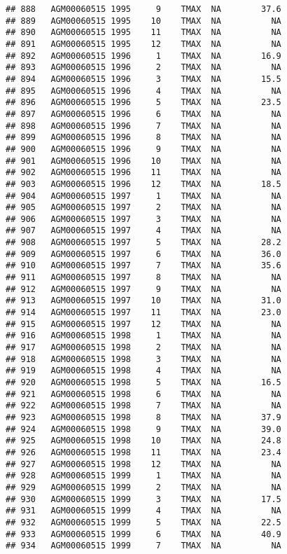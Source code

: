 \documentclass{article}\usepackage[]{graphicx}\usepackage[]{color}
\makeatletter
\newenvironment{kframe}{%
 \def\at@end@of@kframe{}%
 \ifinner\ifhmode%
  \def\at@end@of@kframe{\end{minipage}}%
  \begin{minipage}{\columnwidth}%
 \fi\fi%
 \def\FrameCommand##1{\hskip\@totalleftmargin \hskip-\fboxsep
 \colorbox{shadecolor}{##1}\hskip-\fboxsep
     \hskip-\linewidth \hskip-\@totalleftmargin \hskip\columnwidth}%
 \MakeFramed {\advance\hsize-\width
   \@totalleftmargin\z@ \linewidth\hsize
   \@setminipage}}%
 {\par\unskip\endMakeFramed%
 \at@end@of@kframe}
\newenvironment{knitrout}{}{} %
\makeatother
\begin{document}
\begin{knitrout}
\begin{kframe}
\begin{verbatim}
## 888   AGM00060515 1995     9    TMAX  NA        37.6
## 889   AGM00060515 1995    10    TMAX  NA          NA
## 890   AGM00060515 1995    11    TMAX  NA          NA
## 891   AGM00060515 1995    12    TMAX  NA          NA
## 892   AGM00060515 1996     1    TMAX  NA        16.9
## 893   AGM00060515 1996     2    TMAX  NA          NA
## 894   AGM00060515 1996     3    TMAX  NA        15.5
## 895   AGM00060515 1996     4    TMAX  NA          NA
## 896   AGM00060515 1996     5    TMAX  NA        23.5
## 897   AGM00060515 1996     6    TMAX  NA          NA
## 898   AGM00060515 1996     7    TMAX  NA          NA
## 899   AGM00060515 1996     8    TMAX  NA          NA
## 900   AGM00060515 1996     9    TMAX  NA          NA
## 901   AGM00060515 1996    10    TMAX  NA          NA
## 902   AGM00060515 1996    11    TMAX  NA          NA
## 903   AGM00060515 1996    12    TMAX  NA        18.5
## 904   AGM00060515 1997     1    TMAX  NA          NA
## 905   AGM00060515 1997     2    TMAX  NA          NA
## 906   AGM00060515 1997     3    TMAX  NA          NA
## 907   AGM00060515 1997     4    TMAX  NA          NA
## 908   AGM00060515 1997     5    TMAX  NA        28.2
## 909   AGM00060515 1997     6    TMAX  NA        36.0
## 910   AGM00060515 1997     7    TMAX  NA        35.6
## 911   AGM00060515 1997     8    TMAX  NA          NA
## 912   AGM00060515 1997     9    TMAX  NA          NA
## 913   AGM00060515 1997    10    TMAX  NA        31.0
## 914   AGM00060515 1997    11    TMAX  NA        23.0
## 915   AGM00060515 1997    12    TMAX  NA          NA
## 916   AGM00060515 1998     1    TMAX  NA          NA
## 917   AGM00060515 1998     2    TMAX  NA          NA
## 918   AGM00060515 1998     3    TMAX  NA          NA
## 919   AGM00060515 1998     4    TMAX  NA          NA
## 920   AGM00060515 1998     5    TMAX  NA        16.5
## 921   AGM00060515 1998     6    TMAX  NA          NA
## 922   AGM00060515 1998     7    TMAX  NA          NA
## 923   AGM00060515 1998     8    TMAX  NA        37.9
## 924   AGM00060515 1998     9    TMAX  NA        39.0
## 925   AGM00060515 1998    10    TMAX  NA        24.8
## 926   AGM00060515 1998    11    TMAX  NA        23.4
## 927   AGM00060515 1998    12    TMAX  NA          NA
## 928   AGM00060515 1999     1    TMAX  NA          NA
## 929   AGM00060515 1999     2    TMAX  NA          NA
## 930   AGM00060515 1999     3    TMAX  NA        17.5
## 931   AGM00060515 1999     4    TMAX  NA          NA
## 932   AGM00060515 1999     5    TMAX  NA        22.5
## 933   AGM00060515 1999     6    TMAX  NA        40.9
## 934   AGM00060515 1999     7    TMAX  NA          NA

\end{verbatim}
\end{kframe}
\end{knitrout}
\end{document}
